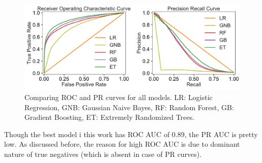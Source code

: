 \documentclass[12pt]{article}
\begin{document}
\begin{figure}[!h]
\begin{center}
\includegraphics[width=6in]{AllModels_ROC_PR_plots.pdf}
\end{center}
\caption{\label{fig:AllModels}
Comparing ROC and PR curves for all models. LR: Logistic Regression, GNB: Gaussian Naive Bayes, RF: Random Forest, GB: Gradient Boosting, ET: Extremely Randomized Trees.}
\end{figure}
Though the best model i this work has ROC AUC of 0.89, the PR AUC is pretty low. As discussed before, the reason for high ROC AUC is due to dominant nature of true negatives (which is absent in case of PR curves). 
\end{document}
